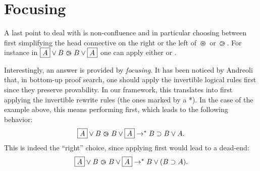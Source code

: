 

\section{Focusing}


A last point to deal with is non-confluence and in particular choosing
between first simplifying the head connective on the right or the left
of $\operatorname{\,\varoast\,}$ or $\operatorname{\,\varogreaterthan\,}$. For instance in
$\fbox{$A$}\lor B \operatorname{\,\varogreaterthan\,} B\lor\fbox{$A$}$ one can apply either
 or .

Interestingly, an answer is provided by {\em focusing}. It has been noticed by
Andreoli~ that, in bottom-up proof search, one should
apply the invertible logical rules first since they preserve provability. In our
framework, this translates into first applying the invertible rewrite rules (the
ones marked by a *).
In the case of the example above, this means performing  first,
which leads to the following behavior:
$$\fbox{$A$}\lor B \operatorname{\,\varogreaterthan\,} B\lor\fbox{$A$}\rightarrow^\ast B\supset B\lor A.$$
This is indeed the ``right'' choice, since applying  first would
lead to a dead-end:
$$\fbox{$A$}\lor B \operatorname{\,\varogreaterthan\,} B\lor\fbox{$A$}\rightarrow^\ast B\lor(B\supset A).$$

